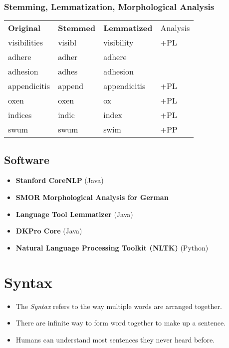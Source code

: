 			\subsubsection{Stemming, Lemmatization, Morphological Analysis} %
				\begin{table}[H]
					\centering
					\begin{tabular}{l l l l}
						\textbf{Original} & \textbf{Stemmed} & \textbf{Lemmatized} & Analysis \\
						visibilities      & visibl           & visibility          & +PL      \\
						adhere            & adher            & adhere              &          \\
						adhesion          & adhes            & adhesion            &          \\
						appendicitis      & append           & appendicitis        & +PL      \\
						oxen              & oxen             & ox                  & +PL      \\
						indices           & indic            & index               & +PL      \\
						swum              & swum             & swim                & +PP
					\end{tabular}
				\end{table}

		\subsection{Software} %
			\begin{itemize}
				\item \textbf{Stanford CoreNLP} (Java)
				\item \textbf{SMOR Morphological Analysis for German}
				\item \textbf{Language Tool Lemmatizer} (Java)
				\item \textbf{DKPro Core} (Java)
				\item \textbf{Natural Language Processing Toolkit (NLTK)} (Python)
			\end{itemize}

	\section{Syntax} %
		\begin{itemize}
			\item The \textit{Syntax} refers to the way multiple words are arranged together.
			\item There are infinite way to form word together to make up a sentence.
			\item Humans can understand most sentences they never heard before.
		\end{itemize}

